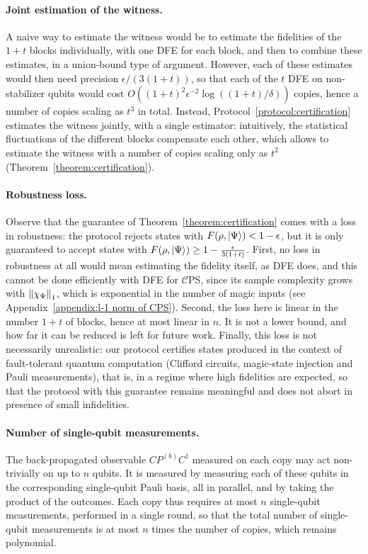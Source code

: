 \documentclass[a4paper,twocolumn,11pt,unpublished]{../../revision/quantumarticle}
\newcommand{\CEPS}{$\mathcal C$PS}
\providecommand{\DIFadd}[1]{{\protect\color{blue} \sf #1}} %
\providecommand{\DIFaddbegin}{} %
\begin{document}
        \DIFaddbegin \paragraph{\DIFadd{Joint estimation of the witness.}}
        \DIFadd{A naive way to estimate the witness would be to estimate the fidelities of the $1+t$ blocks individually, with one DFE for each block, and then to combine these estimates, in a union-bound type of argument. However, each of these estimates would then need precision $\epsilon/(3(1+t))$, so that each of the $t$ DFE on non-stabilizer qubits would cost $O((1+t)^2\epsilon^{-2}\log((1+t)/\delta))$ copies, hence a number of copies scaling as $t^3$ in total. Instead, Protocol~\ref{protocol:certification} estimates the witness jointly, with a single estimator: intuitively, the statistical fluctuations of the different blocks compensate each other, which allows to estimate the witness with a number of copies scaling only as $t^2$ (Theorem~\ref{theorem:certification}).
}

        \paragraph{\DIFadd{Robustness loss.}}
        \DIFadd{Observe that the guarantee of Theorem~\ref{theorem:certification} comes with a loss in robustness: the protocol rejects states with $F(\rho,\ket\Psi)<1-\epsilon$, but it is only guaranteed to accept states with $F(\rho,\ket\Psi)\ge1-\frac{\epsilon}{3(1+t)}$. First, no loss in robustness at all would mean estimating the fidelity itself, as DFE does, and this cannot be done efficiently with DFE for \CEPS, since its sample complexity grows with $\left\lVert\chi_\Psi\right\rVert_1$, which is exponential in the number of magic inputs (see Appendix~\ref{appendix:l-1 norm of CPS}). Second, the loss here is linear in the number $1+t$ of blocks, hence at most linear in $n$. It is not a lower bound, and how far it can be reduced is left for future work. Finally, this loss is not necessarily unrealistic: our protocol certifies states produced in the context of fault-tolerant quantum computation (Clifford circuits, magic-state injection and Pauli measurements), that is, in a regime where high fidelities are expected, so that the protocol with this guarantee remains meaningful and does not abort in presence of small infidelities.
}

        \paragraph{\DIFadd{Number of single-qubit measurements.}}
        \DIFadd{The back-propagated observable $CP^{(b)}C^\dagger$ measured on each copy may act non-trivially on up to $n$ qubits. It is measured by measuring each of these qubits in the corresponding single-qubit Pauli basis, all in parallel, and by taking the product of the outcomes. Each copy thus requires at most $n$ single-qubit measurements, performed in a single round, so that the total number of single-qubit measurements is at most $n$ times the number of copies, which remains polynomial.
}
\end{document}
